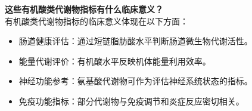 \documentclass[UTF8]{ctexart}
\begin{document}
\begin{tcolorbox}[
    enhanced,
    colback=lightpurple!10, %
    colframe=white,  %
    arc=3mm,
    boxrule=0.5pt,
    width=\textwidth,
    top=8pt,
    bottom=8pt
]
{\small{\color{lightpurple}\faQuestionCircle}\quad \textbf{这些有机酸类代谢物指标有什么临床意义？}\\
{\color{orange!50}\faComments}\quad 有机酸类代谢物指标的临床意义体现在以下方面：
\begin{itemize}
    \item 肠道健康评估：通过短链脂肪酸水平判断肠道微生物代谢活性。
    \item 能量代谢评价：有机酸水平反映机体能量利用效率。
    \item 神经功能参考：氨基酸代谢物可作为评估神经系统状态的指标。
    \item 免疫功能指标：部分代谢物与免疫调节和炎症反应密切相关。
\end{itemize}
}
\end{tcolorbox}
\end{document}
